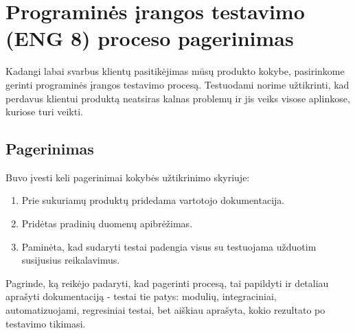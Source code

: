 \documentclass{VUMIFPSkursinis}
\begin{document}
\section{Programinės įrangos testavimo (ENG 8) proceso pagerinimas}	
	Kadangi labai svarbus klientų pasitikėjimas mūsų produkto kokybe, pasirinkome gerinti programinės įrangos testavimo procesą. Testuodami norime užtikrinti, kad perdavus klientui produktą neatsiras kalnas problemų ir jis veiks visose aplinkose, kuriose turi veikti.
	\subsection{Pagerinimas}
	Buvo įvesti keli pagerinimai kokybės užtikrinimo skyriuje:
	\begin{enumerate}
						\item Prie sukuriamų produktų pridedama vartotojo dokumentacija.
						\item Pridėtas pradinių duomenų apibrėžimas.
						\item Paminėta, kad sudaryti testai padengia visus su testuojama užduotim susijusius reikalavimus.
	\end{enumerate}
	Pagrinde, ką reikėjo padaryti, kad pagerinti procesą, tai papildyti ir detaliau aprašyti dokumentaciją - testai tie patys: modulių, integraciniai, automatizuojami, regresiniai testai, bet aiškiau aprašyta, kokio rezultato po testavimo tikimasi.
\end{document}
